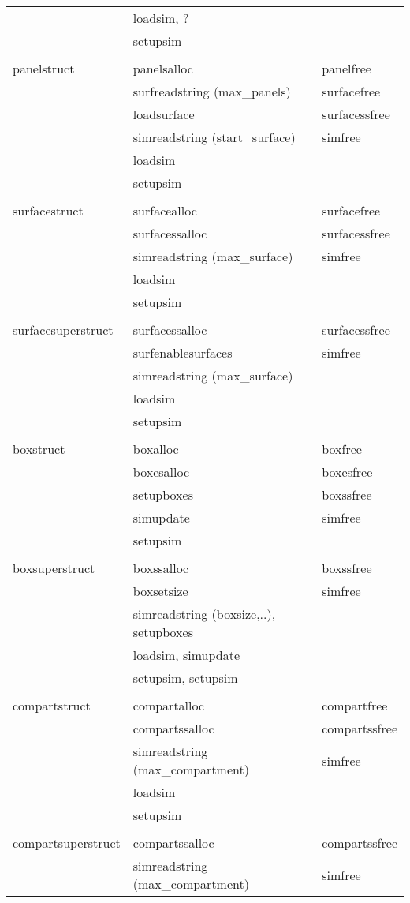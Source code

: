 \documentclass {book}
\begin{document}
\begin{ttfamily}
\begin{longtable}[c]{lll}
&loadsim, ?\\
&setupsim\\
\\
panelstruct&panelsalloc&panelfree\\
&surfreadstring (max\_panels)&surfacefree\\
&loadsurface&surfacessfree\\
&simreadstring (start\_surface)&simfree\\
&loadsim\\
&setupsim&\\
\\
surfacestruct&surfacealloc&surfacefree\\
&surfacessalloc&surfacessfree\\
&simreadstring (max\_surface)&simfree\\
&loadsim\\
&setupsim\\
\\
surfacesuperstruct&surfacessalloc&surfacessfree\\
&surfenablesurfaces&simfree\\
&simreadstring (max\_surface)\\
&loadsim\\
&setupsim\\
\\
boxstruct&boxalloc&boxfree\\
&boxesalloc&boxesfree\\
&setupboxes&boxssfree\\
&simupdate&simfree\\
&setupsim\\
\\
boxsuperstruct&boxssalloc&boxssfree\\
&boxsetsize&simfree\\
&simreadstring (boxsize,..), setupboxes\\
&loadsim, simupdate\\
&setupsim, setupsim\\
\\
compartstruct&compartalloc&compartfree\\
&compartssalloc&compartssfree\\
&simreadstring (max\_compartment)&simfree\\
&loadsim\\
&setupsim\\
\\
compartsuperstruct&compartssalloc&compartssfree\\
&simreadstring (max\_compartment)&simfree\\

\end{longtable}
\end{ttfamily}
\end{document}
